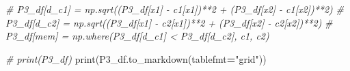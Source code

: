 \documentclass[
]{article}
\newenvironment{Shaded}{\begin{snugshade}}{\end{snugshade}}
\newcommand{\BuiltInTok}[1]{#1}
\newcommand{\CommentTok}[1]{\textcolor[rgb]{0.56,0.35,0.01}{\textit{#1}}}
\newcommand{\NormalTok}[1]{#1}
\newcommand{\OperatorTok}[1]{\textcolor[rgb]{0.81,0.36,0.00}{\textbf{#1}}}
\newcommand{\StringTok}[1]{\textcolor[rgb]{0.31,0.60,0.02}{#1}}
\begin{document}
\begin{Shaded}
\begin{Highlighting}[]
\CommentTok{\# P3\_df[\textquotesingle{}d\_c1\textquotesingle{}] = np.sqrt((P3\_df[\textquotesingle{}x1\textquotesingle{}] {-} c1[\textquotesingle{}x1\textquotesingle{}])**2 + (P3\_df[\textquotesingle{}x2\textquotesingle{}] {-} c1[\textquotesingle{}x2\textquotesingle{}])**2)}
\CommentTok{\# P3\_df[\textquotesingle{}d\_c2\textquotesingle{}] = np.sqrt((P3\_df[\textquotesingle{}x1\textquotesingle{}] {-} c2[\textquotesingle{}x1\textquotesingle{}])**2 + (P3\_df[\textquotesingle{}x2\textquotesingle{}] {-} c2[\textquotesingle{}x2\textquotesingle{}])**2)}
\CommentTok{\# P3\_df[\textquotesingle{}mem\textquotesingle{}] = np.where(P3\_df[\textquotesingle{}d\_c1\textquotesingle{}] \textless{} P3\_df[\textquotesingle{}d\_c2\textquotesingle{}], \textquotesingle{}c1\textquotesingle{}, \textquotesingle{}c2\textquotesingle{})}

\CommentTok{\# print(P3\_df)}
\BuiltInTok{print}\NormalTok{(P3\_df.to\_markdown(tablefmt}\OperatorTok{=}\StringTok{"grid"}\NormalTok{))}
\end{Highlighting}
\end{Shaded}
\end{document}
